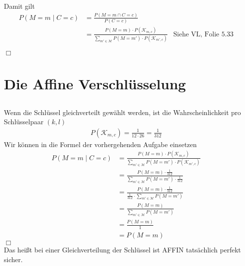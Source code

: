 \documentclass{../crypto}
\begin{document}
Damit gilt 
\begin{align*}
   P(M=m \mid C=c) &= \frac{P(M=m \cap C=c)}{P(C=c)} \\
                   &= \frac{P(M=m)\cdot
P(\mathcal{K}_{m,c})}{\sum_{m'\in\mathcal{M}} P(M=m')\cdot
P(\mathcal{K}_{m',c})} & \text{Siehe VL, Folie 5.33}
\end{align*}

\hfill$\Box$

\section{Die Affine Verschlüsselung}

\subsection{}

\subsection{}

Wenn die Schlüssel gleichverteilt gewählt werden, ist die Wahrscheinlichkeit pro Schlüsselpaar $(k,l)$
\begin{align*}
P(\mathcal{K}_{m,c}) = \frac{1}{12\cdot 26} = \frac{1}{312}
\end{align*}
Wir können in die Formel der vorhergehenden Aufgabe einsetzen
\begin{align*}
P(M=m \mid C=c) &= \frac{P(M=m)\cdot
P(\mathcal{K}_{m,c})}{\sum_{m'\in\mathcal{M}} P(M=m')\cdot
P(\mathcal{K}_{m',c})} \\
            &= \frac{P(M=m)\cdot
\frac{1}{312}}{\sum_{m'\in\mathcal{M}} P(M=m')\cdot
\frac{1}{312}} \\
            &= \frac{P(M=m)\cdot
\frac{1}{312}}{\frac{1}{312}\cdot\sum_{m'\in\mathcal{M}} P(M=m')} \\
            &= \frac{P(M=m)}{\sum_{m'\in\mathcal{M}} P(M=m')} \\
            &= \frac{P(M=m)}{1} \\
            &= P(M=m)
\end{align*}
\hfill$\Box$ \\
Das heißt bei einer Gleichverteilung der Schlüssel ist AFFIN tatsächlich perfekt sicher.
\end{document}
